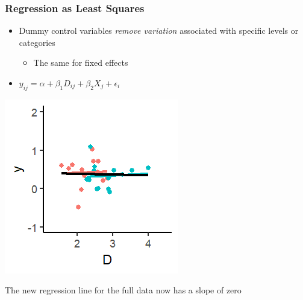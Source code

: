 \documentclass[xcolor=x11names,compress]{beamer}\usepackage[]{graphicx}\usepackage[]{color}
\makeatletter
\def\maxwidth{ %
  \ifdim\Gin@nat@width>\linewidth
    \linewidth
  \else
    \Gin@nat@width
  \fi
}
\newenvironment{knitrout}{}{} %
\renewcommand{\(}{\begin{columns}}
\renewcommand{\)}{\end{columns}}
\newcommand{\<}[1]{\begin{column}{#1}}
\renewcommand{\>}{\end{column}}
\makeatother
\begin{document}
\begin{frame}
\frametitle{Regression as Least Squares}
\begin{itemize}
\item Dummy control variables \textit{remove variation} associated with specific levels or categories
\begin{itemize}
\item The same for fixed effects
\end{itemize}
\item $y_{ij} = \alpha + \beta_1 D_{ij} + \beta_2 X_j + \epsilon_i$
\end{itemize}
\begin{multicols}{2}
\begin{knitrout}
\color{fgcolor}
\includegraphics[width=\maxwidth]{figure/graph_ols_FE5-1} 

\end{knitrout}
\columnbreak
The new regression line for the full data now has a slope of zero
\end{multicols}
\end{frame}
\end{document}
